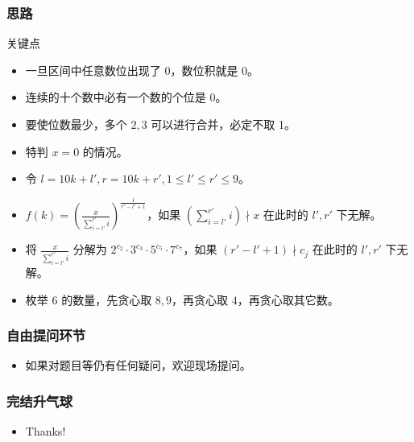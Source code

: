 \documentclass[
     aspectratio=169,                   %
]{beamer}
\begin{document}
\begin{frame}
	\frametitle{思路}
	 
	\begin{exampleblock}{关键点}
		\begin{itemize}
			\item 一旦区间中任意数位出现了 0，数位积就是 0。
			\item 连续的十个数中必有一个数的个位是 0。
			\item 要使位数最少，多个 $2,3$ 可以进行合并，必定不取 1。
		\end{itemize}
	\end{exampleblock}
	\begin{itemize}
		\item 特判 $x=0$ 的情况。
		\item 令 $l=10k+l',r=10k+r',1 \leq l' \leq r' \leq 9$。
		\item $f(k)=(\frac{x}{\sum_{i=l'}^{r'}i})^{\frac{1}{r'-l'+1}}$，如果 $(\sum_{i=l'}^{r'}i) \nmid x$ 在此时的 $l',r'$ 下无解。
		\item 将 $\frac{x}{\sum_{i=l'}^{r'}i}$ 分解为 $2^{c_2}\cdot 3^{c_3}\cdot 5^{c_5}\cdot 7^{c_7}$，如果 $(r'-l'+1) \nmid c_j$ 在此时的 $l',r'$ 下无解。
		\item 枚举 $6$ 的数量，先贪心取 $8,9$，再贪心取 $4$，再贪心取其它数。
	\end{itemize}
	
\end{frame}

\begin{frame}
	\frametitle{自由提问环节}
	\begin{itemize}
		\item 如果对题目等仍有任何疑问，欢迎现场提问。
	\end{itemize}
\end{frame}

\begin{frame}
	\frametitle{完结升气球}
	\begin{itemize}
		\item Thanks!
	\end{itemize}
\end{frame}


\makebottom     %
\end{document}
